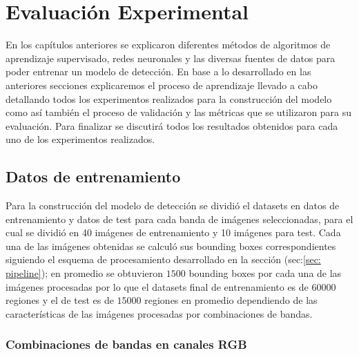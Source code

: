 \chapter{Evaluación Experimental}\label{chap:evaluacion}

En los capítulos anteriores se explicaron diferentes métodos de algoritmos de aprendizaje supervisado, redes neuronales y las diversas fuentes de datos para poder entrenar un modelo de detección. En  base a lo desarrollado en las anteriores secciones  explicaremos el proceso de aprendizaje llevado a cabo detallando todos los  experimentos realizados para la construcción del modelo como así también  el proceso de validación y las métricas que se utilizaron para su evaluación. Para finalizar se discutirá todos los resultados obtenidos para cada uno de los  experimentos realizados. 

\section{Datos de entrenamiento}\label{sec:datos_entrenamiento}

Para la construcción del modelo de detección se dividió el datasets en datos de entrenamiento y datos de test para cada banda de imágenes seleccionadas,  para el cual se dividió en 40 imágenes de entrenamiento y 10 imágenes para test. Cada una de las imágenes obtenidas se calculó sus bounding boxes correspondientes  siguiendo el esquema de procesamiento desarrollado  en la sección (sec:\ref{sec: pipeline}); en promedio se obtuvieron $1500$ bounding boxes por cada una de las imágenes procesadas por lo que el datasets final de entrenamiento es de $60000$ regiones y el de test es de $15000$ regiones en promedio dependiendo de las características de las imágenes procesadas por combinaciones de bandas. 

\subsection{Combinaciones de bandas en canales RGB}\label{sub:comb_de_banda} 


